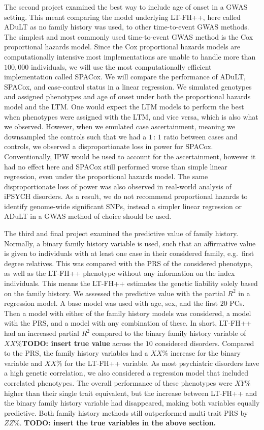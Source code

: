 The second project examined the best way to include age of onset in a GWAS setting. This meant comparing the model underlying LT-FH++, here called ADuLT as no family history was used, to other time-to-event GWAS methods. The simplest and most commonly used time-to-event GWAS method is the Cox proportional hazards model. Since the Cox proportional hazards models are computationally intensive most implementations are unable to handle more than $ 100,000 $ individuals, we will use the most computationally efficient implementation called SPACox. We will compare the performance of ADuLT, SPACox, and case-control status in a linear regression. We simulated genotypes and assigned phenotypes and age of onset under both the proportional hazards model and the LTM. One would expect the LTM models to perform the best when phenotypes were assigned with the LTM, and vice versa, which is also what we observed. However, when we emulated case ascertainment, meaning we downsampled the controls such that we had a $ 1{\,:\,}1 $ ratio between cases and controls, we observed a disproportionate loss in power for SPACox. Conventionally, IPW would be used to account for the ascertainment, however it had no effect here and SPACox still performed worse than simple linear regression, even under the proportional hazards model. The same disproportionate loss of power was also observed in real-world analysis of iPSYCH disorders. As a result, we do not recommend proportional hazards to identify genome-wide significant SNPs, instead a simpler linear regression or ADuLT in a GWAS method of choice should be used.

The third and final project examined the predictive value of family history. Normally, a binary family history variable is used, such that an affirmative value is given to individuals with at least one case in their considered family, e.g.\ first degree relatives. This was compared with the PRS of the considered phenotype, as well as the LT-FH++ phenotype without any information on the index individuals. This means the LT-FH++ estimates the genetic liability solely based on the family history. We assessed the predictive value with the partial $ R^2 $ in a regression model. A base model was used with age, sex, and the first $ 20 $ PCs. Then a model with either of the family history models was considered, a model with the PRS, and a model with any combination of these. In short, LT-FH++ had an increased partial $ R^2 $ compared to the binary family history variable of $ XX\% $\textbf{TODO: insert true value} across the $ 10 $ considered disorders. Compared to the PRS, the family history variables had a $ XX\% $ increase for the binary variable and $ XX\% $ for the LT-FH++ variable. As most psychiatric disorders have a high genetic correlation, we also considered a regression model that included correlated phenotypes. The overall performance of these phenotypes were $ XY\% $ higher than their single trait equivalent, but the increase between LT-FH++ and the binary family history variable had disappeared, making both variables equally predictive. Both family history methods still outperformed multi trait PRS by $ ZZ\% $. \textbf{TODO: insert the true variables in the above section.}

